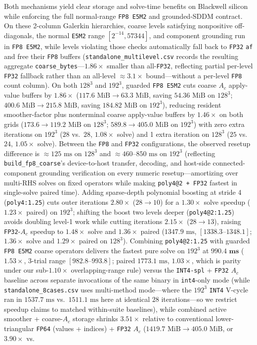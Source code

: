 \documentclass[10pt]{article}
\begin{document}
Both mechanisms yield clear storage and solve-time benefits on Blackwell silicon while enforcing the full normal-range \texttt{FP8 E5M2} and grounded-SDDM contract. On these 2-column Galerkin hierarchies, coarse levels satisfying nonpositive off-diagonals, the normal \texttt{E5M2} range $[2^{-14}, 57344]$, and component grounding run in \texttt{FP8 E5M2}, while levels violating those checks automatically fall back to \texttt{FP32} \texttt{af} and free their \texttt{FP8} buffers (\texttt{standalone\_multilevel.csv} records the resulting aggregate \texttt{coarse\_bytes}---$1.86\times$ smaller than all-\texttt{FP32}, reflecting partial per-level \texttt{FP32} fallback rather than an all-level $\approx 3.1\times$ bound---without a per-level \texttt{FP8} count column). On both $128^3$ and $192^3$, guarded \texttt{FP8 E5M2} cuts coarse $A_c$ apply-value buffers by $\mathbf{1.86\times}$ ($117.6\text{ MiB} \to 63.3\text{ MiB}$, saving $54.36\text{ MiB}$ on $128^3$; $400.6\text{ MiB} \to 215.8\text{ MiB}$, saving $184.82\text{ MiB}$ on $192^3$), reducing resident smoother-factor plus nonterminal coarse apply-value buffers by $\mathbf{1.46\times}$ on both grids ($173.6 \to 119.2\text{ MiB}$ on $128^3$; $589.8 \to 405.0\text{ MiB}$ on $192^3$) with zero extra iterations on $192^3$ ($28$ vs.\ $28$, $1.08\times$ solve) and 1 extra iteration on $128^3$ ($25$ vs.\ $24$, $1.05\times$ solve). Between the \texttt{FP8} and \texttt{FP32} configurations, the observed resetup difference is $\approx 125\text{ ms}$ on $128^3$ and $\approx 460\text{--}850\text{ ms}$ on $192^3$ (reflecting \texttt{build\_fp8\_coarse}'s device-to-host transfer, decoding, and host-side connected-component grounding verification on every numeric resetup---amortizing over multi-RHS solves on fixed operators while making \texttt{poly4@2 + FP32} fastest in single-solve paired time). Adding sparse-depth polynomial boosting at stride 4 (\texttt{poly4:1.25}) cuts outer iterations $2.80\times$ ($28 \to 10$) for a $1.30\times$ solve speedup ($1.23\times$ paired) on $192^3$; shifting the boost two levels deeper (\texttt{poly4@2:1.25}) avoids doubling level-1 work while cutting iterations $2.15\times$ ($28 \to 13$), raising \texttt{FP32}-$A_c$ speedup to $1.48\times$ solve and $1.36\times$ paired ($1347.9\text{ ms}$, $[1338.3\text{--}1348.1]$; $1.36\times$ solve and $1.29\times$ paired on $128^3$). Combining \texttt{poly4@2:1.25} with guarded \texttt{FP8 E5M2} coarse operators delivers the fastest pure solve on $192^3$ at $\mathbf{990.4\text{ ms}}$ ($\mathbf{1.53\times}$, 3-trial range $[982.8\text{--}993.8]$; paired $1773.1\text{ ms}$, $1.03\times$, which is parity under our sub-$1.10\times$ overlapping-range rule) versus the \texttt{INT4-spl} + \texttt{FP32} $A_c$ baseline across separate invocations of the same binary in \texttt{int4}-only mode (while \texttt{standalone\_8cases.csv} uses multi-method mode---where the $192^3$ \texttt{INT4} V-cycle ran in $1537.7\text{ ms}$ vs.\ $1511.1\text{ ms}$ here at identical $28$ iterations---so we restrict speedup claims to matched within-suite baselines), while combined active smoother + coarse-$A_c$ storage shrinks $3.51\times$ relative to conventional lower-triangular \texttt{FP64} (values + indices) + \texttt{FP32} $A_c$ ($1419.7\text{ MiB} \to 405.0\text{ MiB}$, or $3.90\times$ vs.\ 
\end{document}
